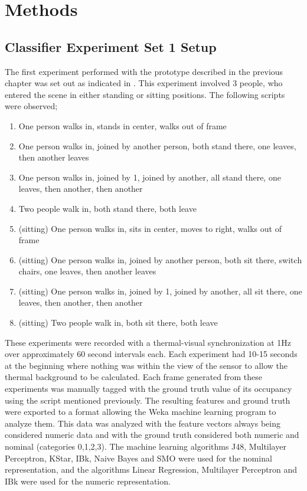 \documentclass[../thesis/thesis.tex]{subfiles}
\begin{document}
 \chapter{Methods}

 \section{Classifier Experiment Set 1 Setup}
The first experiment performed with the prototype described in the previous chapter was set out as indicated in . This experiment involved 3 people, who entered the scene in either standing or sitting positions. The following scripts were observed;

\begin{enumerate}
\item One person walks in, stands in center, walks out of frame
\item One person walks in, joined by another person, both stand there, one leaves, then another leaves
\item One person walks in, joined by 1, joined by another, all stand there, one leaves, then another, then another
\item Two people walk in, both stand there, both leave
\item (sitting) One person walks in, sits in center,  moves to right, walks out of frame
\item (sitting) One person walks in, joined by another person, both sit there, switch chairs, one leaves, then another leaves
\item (sitting) One person walks in, joined by 1, joined by another, all sit there, one leaves, then another, then another
\item (sitting) Two people walk in, both sit there, both leave
\end{enumerate}

These experiments were recorded with a thermal-visual synchronization at 1Hz over approximately 60 second intervals each. Each experiment had 10-15 seconds at the beginning where nothing was within the view of the sensor to allow the thermal background to be calculated. Each frame generated from these experiments was manually tagged with the ground truth value of its occupancy using the script mentioned previously. The resulting features and ground truth were exported to a format allowing the Weka machine learning program to analyze them. This data was analyzed with the feature vectors always being considered numeric data and with the ground truth considered both numeric and nominal (categories {0,1,2,3}). The machine learning algorithms J48, Multilayer Perceptron, KStar, IBk, Naive Bayes and SMO were used for the nominal representation, and the algorithms Linear Regression, Multilayer Perceptron and IBk were used for the numeric representation.
\end{document}
